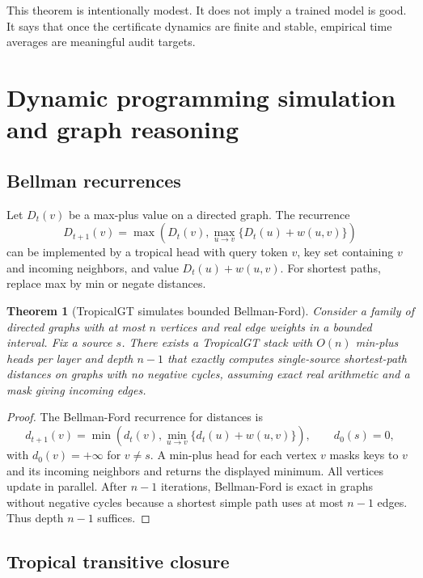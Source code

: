 \documentclass[11pt]{article}
\newtheorem{theorem}[definition]{Theorem}
\begin{document}
This theorem is intentionally modest.  It does not imply a trained model is good.  It says that once the certificate dynamics are finite and stable, empirical time averages are meaningful audit targets.

\section{Dynamic programming simulation and graph reasoning}

\subsection{Bellman recurrences}

Let \(D_t(v)\) be a max-plus value on a directed graph.  The recurrence
\begin{equation}
D_{t+1}(v)=\max\left(D_t(v),\max_{u\to v}\{D_t(u)+w(u,v)\}\right)
\end{equation}
can be implemented by a tropical head with query token \(v\), key set containing \(v\) and incoming neighbors, and value \(D_t(u)+w(u,v)\).  For shortest paths, replace max by min or negate distances.

\begin{theorem}[TropicalGT simulates bounded Bellman-Ford]
Consider a family of directed graphs with at most \(n\) vertices and real edge weights in a bounded interval.  Fix a source \(s\).  There exists a TropicalGT stack with \(O(n)\) min-plus heads per layer and depth \(n-1\) that exactly computes single-source shortest-path distances on graphs with no negative cycles, assuming exact real arithmetic and a mask giving incoming edges.
\end{theorem}
\begin{proof}
The Bellman-Ford recurrence for distances is
\begin{equation}
d_{t+1}(v)=\min\left(d_t(v),\min_{u\to v}\{d_t(u)+w(u,v)\}\right),\qquad d_0(s)=0,
\end{equation}
with \(d_0(v)=+\infty\) for \(v\ne s\).  A min-plus head for each vertex \(v\) masks keys to \(v\) and its incoming neighbors and returns the displayed minimum.  All vertices update in parallel.  After \(n-1\) iterations, Bellman-Ford is exact in graphs without negative cycles because a shortest simple path uses at most \(n-1\) edges.  Thus depth \(n-1\) suffices.
\end{proof}

\subsection{Tropical transitive closure}
\end{document}
